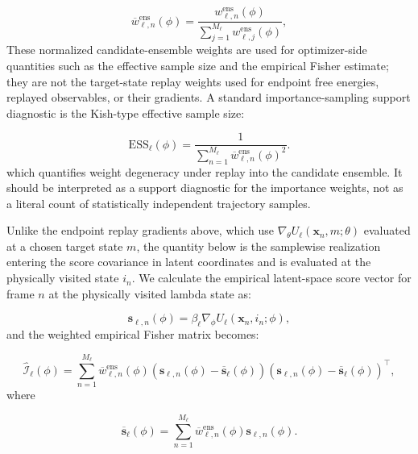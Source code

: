 \begin{equation}
    \overline{w}^{\mathrm{ens}}_{\ell,n}(\phi)
    =
    \frac{
        w^{\mathrm{ens}}_{\ell,n}(\phi)
    }{
        \sum_{j=1}^{M_\ell} w^{\mathrm{ens}}_{\ell,j}(\phi)
    },
    \label{eq:wnorm}
\end{equation}
%
These normalized candidate-ensemble weights are used for optimizer-side quantities such as the effective sample size and the empirical Fisher estimate; they are not the target-state replay weights used for endpoint free energies, replayed observables, or their gradients. A standard importance-sampling support diagnostic is the Kish-type effective sample size:

\begin{equation}
    \mathrm{ESS}_\ell(\phi)
    =
    \frac{1}{
        \sum_{n=1}^{M_\ell}
        \overline{w}^{\mathrm{ens}}_{\ell,n}(\phi)^2
    }.
    \label{eq:ess}
\end{equation}
%
which quantifies weight degeneracy under replay into the candidate ensemble. It should be interpreted as a support diagnostic for the importance weights, not as a literal count of statistically independent trajectory samples.

Unlike the endpoint replay gradients above, which use $\nabla_\theta U_\ell(\mathbf{x}_n, m; \theta)$ evaluated at a chosen target state $m$, the quantity below is the samplewise realization entering the score covariance in latent coordinates and is evaluated at the physically visited state $i_n$. We calculate the empirical latent-space score vector for frame $n$ at the physically visited lambda state as:

\begin{equation}
    \mathbf{s}_{\ell,n}(\phi)
    =
    \beta_\ell
    \nabla_\phi
    U_\ell(\mathbf{x}_n, i_n; \phi),
    \label{eq:scoreemp}
\end{equation}
%
and the weighted empirical Fisher matrix becomes:

\begin{equation}
    \widehat{\mathcal{I}}_\ell(\phi)
    =
    \sum_{n=1}^{M_\ell}
    \overline{w}^{\mathrm{ens}}_{\ell,n}(\phi)
    \left(
        \mathbf{s}_{\ell,n}(\phi)
        -
        \overline{\mathbf{s}}_\ell(\phi)
    \right)
    \left(
        \mathbf{s}_{\ell,n}(\phi)
        -
        \overline{\mathbf{s}}_\ell(\phi)
    \right)^\top,
    \label{eq:fimemp}
\end{equation}
%
where

\begin{equation}
    \overline{\mathbf{s}}_\ell(\phi)
    =
    \sum_{n=1}^{M_\ell}
    \overline{w}^{\mathrm{ens}}_{\ell,n}(\phi)
    \mathbf{s}_{\ell,n}(\phi).
    \label{eq:meanemp}
\end{equation}

